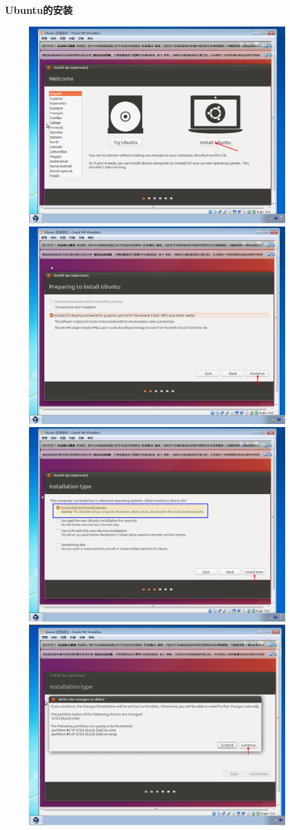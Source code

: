 \frame
{
	\frametitle{\textrm{Ubuntu}的安装}
\begin{figure}[h!]
\centering
\vspace{-12.5pt}
\includegraphics[height=0.37\textwidth]{Figures/Virtualbox-ubuntu-install-3.png}
\includegraphics[height=0.37\textwidth]{Figures/Virtualbox-ubuntu-install-4.png}
\includegraphics[height=0.37\textwidth]{Figures/Virtualbox-ubuntu-install-5.png}
\includegraphics[height=0.37\textwidth]{Figures/Virtualbox-ubuntu-install-6.png}
\caption{\textrm{\fontsize{6.2pt}{5.2pt}\selectfont{The install step-4 of Ubuntu in Virtualbox.}}}
\label{Virtualbox-ubuntu-install-3}
\end{figure}
}

